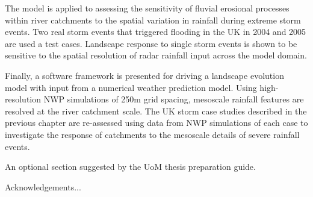 The model is applied to assessing the sensitivity of fluvial erosional processes within river catchments to the spatial variation in rainfall during extreme storm events. Two real storm events that triggered flooding in the UK in 2004 and 2005 are used a test cases. Landscape response to single storm events is shown to be sensitive to the spatial resolution of radar rainfall input across the model domain.

Finally, a software framework is presented for driving a landscape evolution model with input from a numerical weather prediction model. Using high-resolution NWP simulations of 250m grid spacing, mesoscale rainfall features are resolved at the river catchment scale. The UK storm case studies described in the previous chapter are re-assessed using data from NWP simulations of each case to investigate the response of catchments to the mesoscale details of severe rainfall events.


%
%
%

\afterabstract

An optional section suggested by the UoM thesis preparation guide.

Acknowledgements...


\afterpreface
